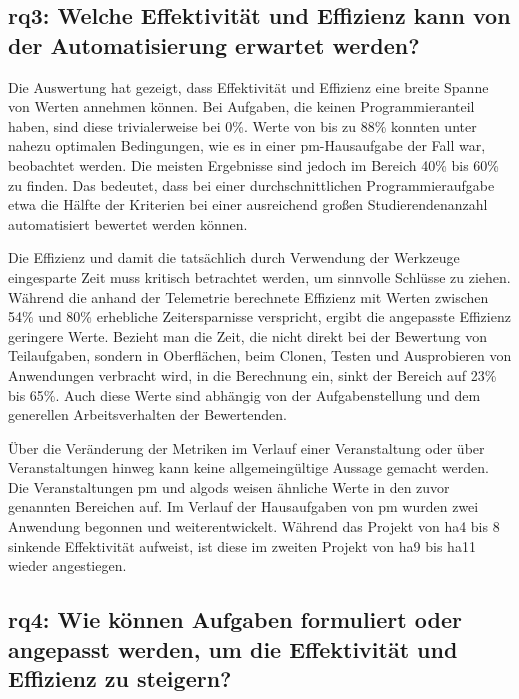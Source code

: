 \subsection[\acs{rq}3]{\ac{rq}3: Welche Effektivität und Effizienz kann von der Automatisierung erwartet werden?}\label{subsec:ra3-effectivity-efficiency}

Die Auswertung hat gezeigt, dass Effektivität und Effizienz eine breite Spanne von Werten annehmen können.
Bei Aufgaben, die keinen Programmieranteil haben, sind diese trivialerweise bei 0\%.
Werte von bis zu 88\% konnten unter nahezu optimalen Bedingungen, wie es in einer \ac{pm}-Hausaufgabe der Fall war, beobachtet werden.
Die meisten Ergebnisse sind jedoch im Bereich 40\% bis 60\% zu finden.
Das bedeutet, dass bei einer durchschnittlichen Programmieraufgabe etwa die Hälfte der Kriterien bei einer ausreichend großen Studierendenanzahl automatisiert bewertet werden können.

Die Effizienz und damit die tatsächlich durch Verwendung der Werkzeuge eingesparte Zeit muss kritisch betrachtet werden, um sinnvolle Schlüsse zu ziehen.
Während die anhand der Telemetrie berechnete Effizienz mit Werten zwischen 54\% und 80\% erhebliche Zeitersparnisse verspricht, ergibt die angepasste Effizienz geringere Werte.
Bezieht man die Zeit, die nicht direkt bei der Bewertung von Teilaufgaben, sondern in Oberflächen, beim Clonen, Testen und Ausprobieren von Anwendungen verbracht wird, in die Berechnung ein, sinkt der Bereich auf 23\% bis 65\%.
Auch diese Werte sind abhängig von der Aufgabenstellung und dem generellen Arbeitsverhalten der Bewertenden.

Über die Veränderung der Metriken im Verlauf einer Veranstaltung oder über Veranstaltungen hinweg kann keine allgemeingültige Aussage gemacht werden.
Die Veranstaltungen \ac{pm} und \ac{algods} weisen ähnliche Werte in den zuvor genannten Bereichen auf.
Im Verlauf der Hausaufgaben von \ac{pm} wurden zwei Anwendung begonnen und weiterentwickelt.
Während das Projekt von \ac{ha}4 bis 8 sinkende Effektivität aufweist, ist diese im zweiten Projekt von \ac{ha}9 bis \ac{ha}11 wieder angestiegen.

\subsection[\acs{rq}4]{\ac{rq}4: Wie können Aufgaben formuliert oder angepasst werden, um die Effektivität und Effizienz zu steigern?}\label{subsec:ra4-improve-effectivity-efficiency}

